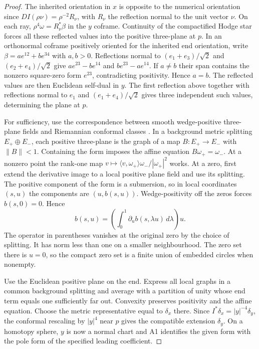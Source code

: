 \documentclass[11pt,letterpaper]{article}
\numberwithin{equation}{section}
\begin{document}
\begin{proof}
The inherited orientation in \(x\) is opposite to the numerical
orientation since \(DI(\rho\nu)=\rho^{-2}R_\nu\), with \(R_\nu\)
the reflection normal to the unit vector \(\nu\). On each ray,
\(\rho^4\omega=R_\nu^*\beta\) in the \(y\) coframe. Continuity of
the compactified Hodge star forces all these reflected values into
the positive three-plane at \(p\). In an orthonormal coframe positively
oriented for the inherited end orientation, write
\(\beta=a e^{12}+b e^{34}\) with \(a,b>0\). Reflections normal to
\((e_1+e_3)/\sqrt2\) and \((e_2+e_4)/\sqrt2\) give
\(a e^{23}-b e^{14}\) and \(b e^{23}-a e^{14}\). If \(a\ne b\)
their span contains the nonzero square-zero form \(e^{23}\),
contradicting positivity. Hence \(a=b\). The reflected values are
then Euclidean self-dual in \(y\). The first reflection above together
with reflections normal to \(e_1\) and \((e_1+e_4)/\sqrt2\) gives
three independent such values, determining the plane at \(p\).

For sufficiency, use the correspondence between smooth wedge-positive
three-plane fields and Riemannian conformal classes
\cite[\S7.2, p.~1106]{AurouxDonaldsonKatzarkov2005SingularPencils}.
In a background metric splitting \(E_+\oplus E_-\), each positive
three-plane is the graph of a map \(B:E_+\to E_-\) with \(\|B\|<1\).
Containing the form imposes the affine equation
\(B\omega_+=\omega_-\). At a nonzero point the rank-one map
\(v\mapsto\langle v,\omega_+\rangle\omega_-/|\omega_+|^2\) works.
At a zero, first extend the derivative image to a local positive
plane field and use its splitting. The positive component of the form
is a submersion, so in local coordinates \((s,u)\) the components
are \((u,b(s,u))\). Wedge-positivity off the zeros forces
\(b(s,0)=0\). Hence
\[
 b(s,u)=\left(\int_0^1 \partial_u b(s,\lambda u)\,d\lambda\right)u.
\]
The operator in parentheses vanishes at the original zero by the choice
of splitting. It has norm less than one on a smaller neighbourhood.
The zero set there is \(u=0\), so the compact zero set is a finite
union of embedded circles when nonempty.

Use the Euclidean positive plane on the end. Express all local graphs
in a common background splitting and average with a partition of unity
whose end term equals one sufficiently far out. Convexity preserves
positivity and the affine equation. Choose the metric representative equal to \(\delta_x\) there. Since
\(I^*\delta_x=|y|^{-4}\delta_y\), the conformal rescaling by \(|y|^4\) near
\(p\) gives the compatible extension \(\delta_y\). On a homotopy sphere, \(y\) is now a normal chart and
A1 identifies the given form with the pole form of the specified
leading coefficient.
\end{proof}
\end{document}

